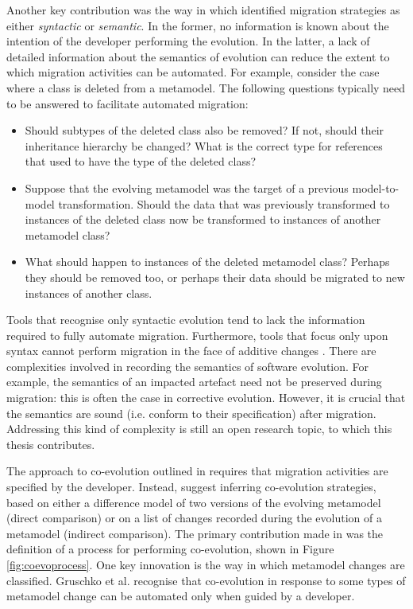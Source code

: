 Another key contribution was the way in which \cite{sprinkle04domain} identified migration strategies as either \emph{syntactic} or \emph{semantic}. In the former, no information is known about the intention of the developer performing the evolution. In the latter, a lack of detailed information about the semantics of evolution can reduce the extent to which migration activities can be automated. For example, consider the case where a class is deleted from a metamodel. The following questions typically need to be answered to facilitate automated migration:
 \begin{itemize}
  \item Should subtypes of the deleted class also be removed? If not, should their inheritance hierarchy be changed? What is the correct type for references that used to have the type of the deleted class?
  \item Suppose that the evolving metamodel was the target of a previous model-to-model transformation. Should the data that was previously transformed to instances of the deleted class now be transformed to instances of another metamodel class?
  \item What should happen to instances of the deleted metamodel class? Perhaps they should be removed too, or perhaps their data should be migrated to new instances of another class.
 \end{itemize}

Tools that recognise only syntactic evolution tend to lack the information required to fully automate migration. Furthermore, tools that focus only upon syntax cannot perform migration in the face of additive changes \cite{gruschko07towards}. There are complexities involved in recording the semantics of software evolution. For example, the semantics of an impacted artefact need not be preserved during migration: this is often the case in corrective evolution. However, it is crucial that the semantics are sound (i.e. conform to their specification) after migration. Addressing this kind of complexity is still an open research topic, to which this thesis contributes.

The approach to co-evolution outlined in \cite{sprinkle04domain} requires that migration activities are specified by the developer. Instead, \cite{gruschko07towards} suggest inferring co-evolution strategies, based on either a difference model of two versions of the evolving metamodel (direct comparison) or on a list of changes recorded during the evolution of a metamodel (indirect comparison). The primary contribution made in \cite{sprinkle04domain} was the definition of a process for performing co-evolution, shown in Figure \ref{fig:coevoprocess}. One key innovation is the way in which metamodel changes are classified. Gruschko et al. recognise that co-evolution in response to some types of metamodel change can be automated only when guided by a developer.


